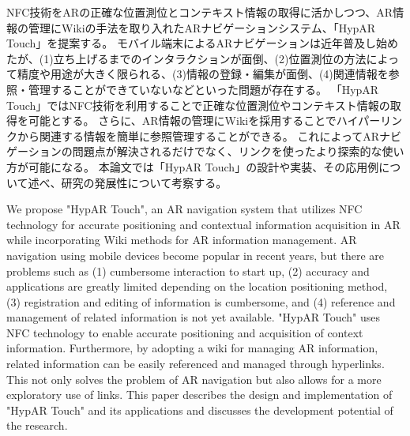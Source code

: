 


\begin{jabstract}
NFC技術をARの正確な位置測位とコンテキスト情報の取得に活かしつつ、AR情報の管理にWikiの手法を取り入れたARナビゲーションシステム、「HypAR Touch」を提案する。
モバイル端末によるARナビゲーションは近年普及し始めたが、(1)立ち上げるまでのインタラクションが面倒、(2)位置測位の方法によって精度や用途が大きく限られる、(3)情報の登録・編集が面倒、(4)関連情報を参照・管理することができていないなどといった問題が存在する。
「HypAR Touch」ではNFC技術を利用することで正確な位置測位やコンテキスト情報の取得を可能とする。
さらに、AR情報の管理にWikiを採用することでハイパーリンクから関連する情報を簡単に参照管理することができる。
これによってARナビゲーションの問題点が解決されるだけでなく、リンクを使ったより探索的な使い方が可能になる。
本論文では「HypAR Touch」の設計や実装、その応用例について述べ、研究の発展性について考察する。
\end{jabstract}



\begin{eabstract}
We propose "HypAR Touch", an AR navigation system that utilizes NFC technology for accurate positioning and contextual information acquisition in AR while incorporating Wiki methods for AR information management. 
AR navigation using mobile devices become popular in recent years, but there are problems such as (1) cumbersome interaction to start up, (2) accuracy and applications are greatly limited depending on the location positioning method, (3) registration and editing of information is cumbersome, and (4) reference and management of related information is not yet available. 
"HypAR Touch" uses NFC technology to enable accurate positioning and acquisition of context information. 
Furthermore, by adopting a wiki for managing AR information, related information can be easily referenced and managed through hyperlinks. 
This not only solves the problem of AR navigation but also allows for a more exploratory use of links.
This paper describes the design and implementation of "HypAR Touch" and its applications and discusses the development potential of the research.
\end{eabstract}
